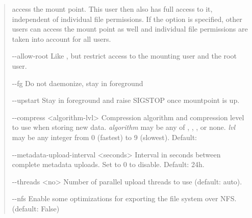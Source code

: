 \documentclass[letterpaper,10pt,english]{sphinxmanual}
\begin{document}
\begin{quote}
\begin{optionlist}{3cm}
access the mount point. This user then also has full
access to it, independent of individual file
permissions. If the  option is
specified, other users can access the mount point as
well and individual file permissions are taken into
account for all users.
\item [-{-}allow-root]  
Like , but restrict access to the
mounting user and the root user.
\item [-{-}fg]  
Do not daemonize, stay in foreground
\item [-{-}upstart]  
Stay in foreground and raise SIGSTOP once mountpoint
is up.
\item [-{-}compress \textless{}algorithm-lvl\textgreater{}]  
Compression algorithm and compression level to use
when storing new data. \emph{algorithm} may be any of
, , , or none. \emph{lvl} may be any
integer from 0 (fastest) to 9 (slowest). Default:
\item [-{-}metadata-upload-interval \textless{}seconds\textgreater{}]  
Interval in seconds between complete metadata uploads.
Set to 0 to disable. Default: 24h.
\item [-{-}threads \textless{}no\textgreater{}]  
Number of parallel upload threads to use (default:
auto).
\item [-{-}nfs]  
Enable some optimizations for exporting the file
system over NFS. (default: False)
\end{optionlist}
\end{quote}
\end{document}

